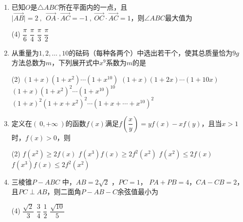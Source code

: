 \documentclass[11pt,a4paper]{ctexart}
\begin{document}
\begin{enumerate}
    \item 已知$O$是$\triangle ABC$所在平面内的一点，且$\mid \overrightarrow{AB} \mid=2\ ,\ \ \overrightarrow{OA} \cdot \overrightarrow{AC}=-1\ ,\ \overrightarrow{OC} \cdot \overrightarrow{AC}=1$，则$\angle ABC$最大值为
    \begin{tasks}(4)
        \task $\dfrac{\pi}{6}$ 
        \task $\dfrac{\pi}{4}$
        \task $\dfrac{\pi}{3}$
        \task $\dfrac{\pi}{2}$
    \end{tasks}
    

    \item 从重量为$1,2,\ldots\ ,10$的砝码（每种各两个）中选出若干个，使其总质量恰为$9g$方法总数为$m$，下列展开式中$x^9$系数为$m$的是
    \begin{tasks}(2)
        \task $(1+x)(1+x^2) \cdots (1+x^{10})$
        \task $(1+x)(1+2x) \cdots (1+10x)$
        \task $(1+x)(1+x^2)^2 \cdots (1+x^{10})^{10}$ 
        \task $(1+x)^2(1+x+x^2)^2 \cdots (1+x+ \cdots +x^{10})^2$ 
    \end{tasks}

    \item 定义在$(\ 0,+\infty \ )$的函数$f(x)$满足$f(\dfrac{x}{y})=yf(x)-xf(y)$，且当$x>1$时，$f(x)>0$，则    
    \begin{tasks}(2)
        \task $f(x^2) \ge 2f(x)$ 
        \task $f(x^3)f(x) \ge 2f^2(x^2)$
        \task $f(x^2) \le 2f(x)$
        \task $f(x^3)f(x) \le 2f^2(x^2)$
    \end{tasks}

    \item 三棱锥$P-ABC$ 中，$AB=2\sqrt{2}$ ，$PC=1$， $PA+PB=4$，$CA-CB=2$，且$PC \perp AB$，则二面角$P-AB-C$余弦值最小为
    \begin{tasks}(4)
        \task $\dfrac{\sqrt{2}}{3}$ 
        \task $\dfrac{3}{4}$
        \task $\dfrac{1}{2}$
        \task $\dfrac{\sqrt{10}}{5}$
    \end{tasks}
\end{enumerate}
\end{document}
